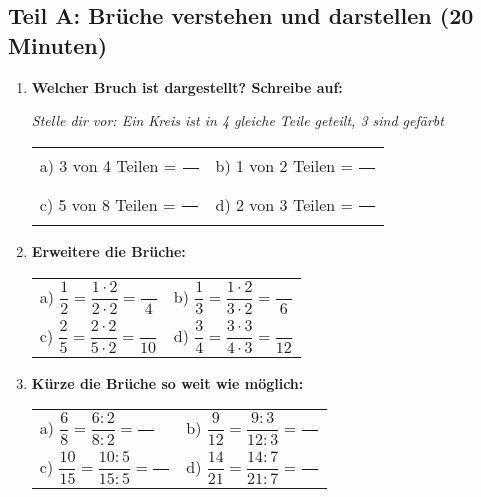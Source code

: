 \subsection*{Teil A: Brüche verstehen und darstellen (20 Minuten)}

\begin{enumerate}[label=\arabic*.]
    \item \textbf{Welcher Bruch ist dargestellt? Schreibe auf:}
    \vspace{0.5cm}

    \textit{Stelle dir vor: Ein Kreis ist in 4 gleiche Teile geteilt, 3 sind gefärbt}
    \begin{tabular}{ll}
        a) 3 von 4 Teilen = $\dfrac{\phantom{00}}{\phantom{00}}$ & b) 1 von 2 Teilen = $\dfrac{\phantom{00}}{\phantom{00}}$ \\[2ex]
        c) 5 von 8 Teilen = $\dfrac{\phantom{00}}{\phantom{00}}$ & d) 2 von 3 Teilen = $\dfrac{\phantom{00}}{\phantom{00}}$
    \end{tabular}

    \vspace{1cm}

    \item \textbf{Erweitere die Brüche:}
    \vspace{0.5cm}
    \begin{tabular}{ll}
        a) $\dfrac{1}{2} = \dfrac{1 \cdot 2}{2 \cdot 2} = \dfrac{\phantom{00}}{4}$ & b) $\dfrac{1}{3} = \dfrac{1 \cdot 2}{3 \cdot 2} = \dfrac{\phantom{00}}{6}$ \\[4ex]
        c) $\dfrac{2}{5} = \dfrac{2 \cdot 2}{5 \cdot 2} = \dfrac{\phantom{00}}{10}$ & d) $\dfrac{3}{4} = \dfrac{3 \cdot 3}{4 \cdot 3} = \dfrac{\phantom{00}}{12}$
    \end{tabular}

    \vspace{1cm}

    \item \textbf{Kürze die Brüche so weit wie möglich:}
    \vspace{0.5cm}
    \begin{tabular}{ll}
        a) $\dfrac{6}{8} = \dfrac{6:2}{8:2} = \dfrac{\phantom{00}}{\phantom{00}}$ & b) $\dfrac{9}{12} = \dfrac{9:3}{12:3} = \dfrac{\phantom{00}}{\phantom{00}}$ \\[4ex]
        c) $\dfrac{10}{15} = \dfrac{10:5}{15:5} = \dfrac{\phantom{00}}{\phantom{00}}$ & d) $\dfrac{14}{21} = \dfrac{14:7}{21:7} = \dfrac{\phantom{00}}{\phantom{00}}$
    \end{tabular}
\end{enumerate}